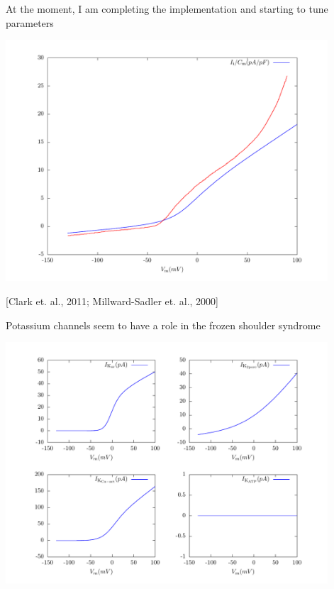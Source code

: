 \documentclass{beamer}
\newcommand{\references}[1] {
  \begin{flushright}
    \scriptsize [#1] \normalsize
  \end{flushright}
}
\begin{document}
\begin{frame}{At the moment, I am completing the implementation and
    starting to tune parameters}

  \vspace{-0.4cm}

  \begin{center}
    \includegraphics[width=0.9\textwidth]{../results/pdf/20110506/membrane_behaviour-vi}
  \end{center}

  \references{Clark et. al., 2011; Millward-Sadler et. al., 2000}

\end{frame}

\begin{frame}{Potassium channels seem to have a role in the frozen
    shoulder syndrome}

  \vspace{-0.4cm}

  \begin{center}
    \includegraphics[width=0.9\textwidth]{../results/pdf/20110506/potassium_currents-vi}
  \end{center}

  \vspace{1.8em}

\end{frame}
\end{document}
